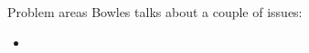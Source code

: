 \documentclass[presentation]{subfiles}
\begin{document}
\begin{frame}{Problem areas}
Bowles talks about a couple of issues:
\begin{itemize}
  \item 
\end{itemize}
\end{frame}
\end{document}
